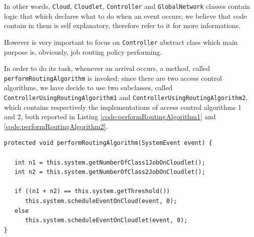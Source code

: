 \documentclass[10pt,a4paper]{article}
\begin{document}
In other words, \texttt{Cloud}, \texttt{Cloudlet}, \texttt{Controller} and \texttt{GlobalNetwork} classes contain logic that which declares what to do when an event occurs; we believe that code contain in them is self explanatory, therefore refer to it for more informations.

However is very important to focus on \texttt{Controller} abstract class which main purpose is, obviously, job routing policy performing.

In order to do its task, whenever an arrival occurs, a method, called \texttt{performRouting\-Algorithm} is invoked; since there are two access control algorithms, we have decide to use two subclasses, called \texttt{Controller\-Using\-Routing\-Algorithm1} and \texttt{Controller\-Using\-Routing\-Algorithm2}, which contains respectively the implementations of access control algorithms 1 and 2, both reported in Listing \ref{code:performRoutingAlgorithm1} and \ref{code:performRoutingAlgorithm2}.

\begin{lstlisting}[frame=lines, caption={\texttt{performRoutingAlgorithm} method implementation concerning access control algorithm 1.},label={code:performRoutingAlgorithm1}]
protected void performRoutingAlgorithm(SystemEvent event) {

   int n1 = this.system.getNumberOfClass1JobOnCloudlet();
   int n2 = this.system.getNumberOfClass2JobOnCloudlet();

   if ((n1 + n2) == this.system.getThreshold())
      this.system.scheduleEventOnCloud(event, 0);
   else
      this.system.scheduleEventOnCloudlet(event, 0);
}
\end{lstlisting}
\end{document}
